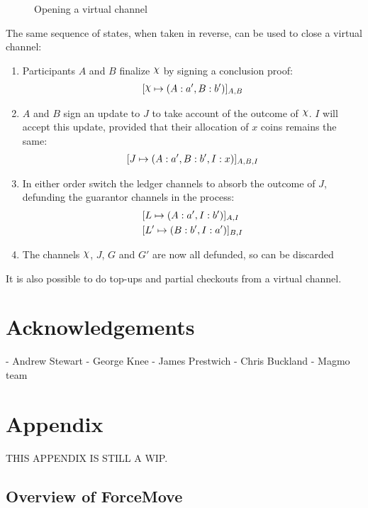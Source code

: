 \documentclass{article}
\begin{document}
\begin{figure}[ht]
  \centering
  
  \caption{Opening a virtual channel}
  \label{fig:virtual-channel-opening}
\end{figure}

The same sequence of states, when taken in reverse, can be used to close a virtual channel:
\begin{enumerate}
  \item Participants $A$ and $B$ finalize $\rchi$ by signing a conclusion proof:
  \begin{align}
    \finalizable{\rchi}{\alloc{A:a', B:b'}}{A,B}
  \end{align}
  \item $A$ and $B$ sign an update to $J$ to take account of the outcome of $\rchi$. $I$ will accept this update, provided that their allocation of $x$ coins remains the same:
  \begin{align}
    [J \mapsto ( A: a', B:b', I: x )]_{A, B, I}
  \end{align}
  \item In either order switch the ledger channels to absorb the outcome of $J$, defunding the guarantor channels in the process:
  \begin{align}
    & [L \mapsto ( A: a', I: b' )]_{A,I} \\
    & [L' \mapsto ( B: b', I: a' )]_{B,I}
  \end{align}
  \item The channels $\rchi$, $J$, $G$ and $G'$ are now all defunded, so can be discarded
\end{enumerate}

It is also possible to do top-ups and partial checkouts from a virtual channel.

\section{Acknowledgements}

- Andrew Stewart
- George Knee
- James Prestwich
- Chris Buckland
- Magmo team

\newpage

\section{Appendix}

THIS APPENDIX IS STILL A WIP.

\subsection{Overview of ForceMove}
\end{document}
